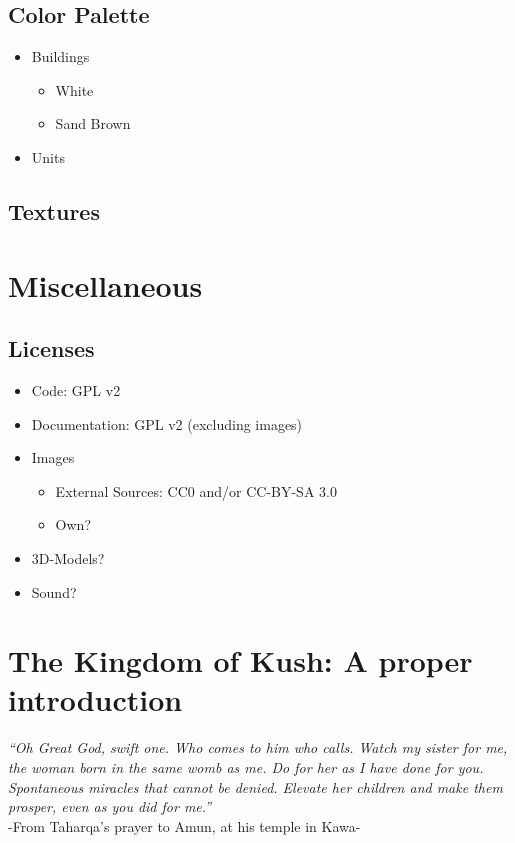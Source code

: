 \documentclass[a4paper,12pt]{scrreprt}
\begin{document}
\section{Color Palette}

\begin{itemize}
	\item Buildings
	\begin{itemize}
		\item White
		\item Sand Brown
	\end{itemize}
	\item Units
\end{itemize}

\section{Textures}

\chapter{Miscellaneous}

\section{Licenses}

\begin{itemize}
	\item Code: GPL v2
	\item Documentation: GPL v2 (excluding images)
	\item Images
	\begin{itemize}
		\item External Sources: CC0 and/or CC-BY-SA 3.0
		\item Own?
	\end{itemize}
	\item 3D-Models?
	\item Sound?
\end{itemize}

\chapter{The Kingdom of Kush: A proper introduction}

\begin{center}
\textit{“Oh Great God, swift one. Who comes to him who calls. Watch my sister for me, the woman born in the same womb as me. Do for her as I have done for you. Spontaneous miracles that cannot be denied. Elevate her children and make them prosper, even as you did for me.”}\\[12pt]

\noindent
-From Taharqa’s prayer to Amun, at his temple in Kawa-
\end{center}
\end{document}
